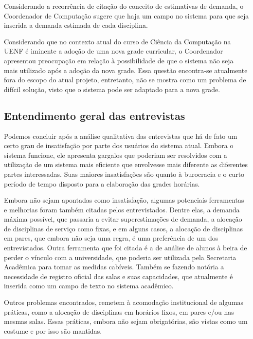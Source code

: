 Considerando a recorrência de citação do conceito de estimativas de demanda, o Coordenador de Computação sugere que haja um campo no sistema para que seja inserida a demanda estimada de cada disciplina.

Considerando que no contexto atual do curso de Ciência da Computação na UENF é iminente a adoção de uma nova grade curricular, o Coordenador apresentou preocupação em relação à possibilidade de que o sistema não seja mais utilizado após a adoção da nova grade. Essa questão encontra-se atualmente fora do escopo do atual projeto, entretanto, não se mostra como um problema de difícil solução, visto que o sistema pode ser adaptado para a nova grade.

\subsection{Entendimento geral das entrevistas} %

Podemos concluir após a análise qualitativa das entrevistas que há de fato um certo grau de insatisfação por parte dos usuários do sistema atual. Embora o sistema funcione, ele apresenta gargalos que poderiam ser resolvidos com a utilização de um sistema mais eficiente que envolvesse mais diferente as diferentes partes interessadas. Suas maiores insatisfações são quanto à burocracia e o curto período de tempo disposto para a elaboração das grades horárias.

Embora não sejam apontadas como insatisfação, algumas potenciais ferramentas e melhorias foram também citadas pelos entrevistados. Dentre elas, a demanda máxima possível, que passaria a evitar superestimações de demanda, a alocação de disciplinas de serviço como fixas, e em alguns casos, a alocação de disciplinas em pares, que embora não seja uma regra, é uma preferência de um dos entrevistados. Outra ferramenta que foi citada é a de análise de alunos à beira de perder o vínculo com a universidade, que poderia ser utilizada pela Secretaria Acadêmica para tomar as medidas cabíveis. Também se fazendo notória a necessidade de registro oficial das salas e suas capacidades, que atualmente é inserida como um campo de texto no sistema acadêmico.

Outros problemas encontrados, remetem à acomodação institucional de algumas práticas, como a alocação de disciplinas em horários fixos, em pares e/ou nas mesmas salas. Essas práticas, embora não sejam obrigatórias, são vistas como um costume e por isso são mantidas.

